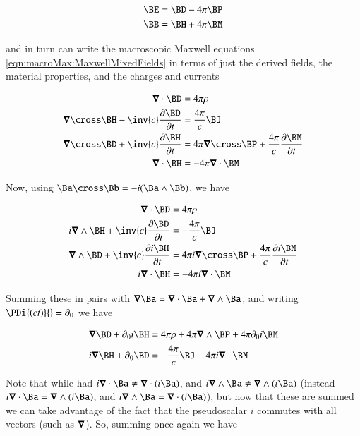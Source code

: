 \begin{align}
\BE &= \BD - 4\pi \BP \\
\BB &= \BH + 4\pi \BM
\end{align}

and in turn can write the macroscopic Maxwell equations \ref{eqn:macroMax:MaxwellMixedFields}
in terms of just the derived fields, the material properties, and the charges and currents

\begin{align*}
\spacegrad \cdot \BD &= 4 \pi \rho \\
\spacegrad \cross \BH - \inv{c} \PD{t}{\BD} &= \frac{4 \pi}{c} \BJ \\
\spacegrad \cross \BD + \inv{c} \PD{t}{ \BH } &= 4 \pi \spacegrad \cross \BP + \frac{4\pi}{c} \PD{t}{ \BM }  \\
\spacegrad \cdot \BH &= - 4 \pi \spacegrad \cdot \BM \\
\end{align*}

Now, using $\Ba \cross \Bb = -i (\Ba \wedge \Bb)$, we have

\begin{align*}
\spacegrad \cdot \BD &= 4 \pi \rho \\
i \spacegrad \wedge \BH + \inv{c} \PD{t}{\BD} &= -\frac{4 \pi}{c} \BJ \\
\spacegrad \wedge \BD + \inv{c} \PD{t}{ i\BH } &= 4 \pi i \spacegrad \cross \BP + \frac{4\pi}{c} \PD{t}{ i \BM }  \\
i \spacegrad \cdot \BH &= - 4 \pi i \spacegrad \cdot \BM \\
\end{align*}

Summing these in pairs with $\spacegrad \Ba = \spacegrad \cdot \Ba + \spacegrad \wedge \Ba$, and writing $\PDi{(ct)}{} = \partial_0$ we have

\begin{align*}
\spacegrad \BD + \partial_0 {i\BH } &= 4 \pi \rho + 4 \pi \spacegrad \wedge \BP + {4\pi} \partial_0 { i \BM }  \\
i \spacegrad \BH + \partial_0 {\BD} &= -\frac{4 \pi}{c} \BJ - 4 \pi i \spacegrad \cdot \BM \\
\end{align*}

Note that while had $i\spacegrad \cdot \Ba \ne \spacegrad \cdot (i\Ba)$, and
$i\spacegrad \wedge \Ba \ne \spacegrad \wedge (i\Ba)$
(instead $i\spacegrad \cdot \Ba = \spacegrad \wedge (i\Ba)$, and
$i\spacegrad \wedge \Ba = \spacegrad \cdot (i\Ba)$), but now that these are summed we can take advantage of the fact that the pseudoscalar $i$
commutes with all vectors (such as $\boldsymbol{\nabla}$).  So, summing once again we have

